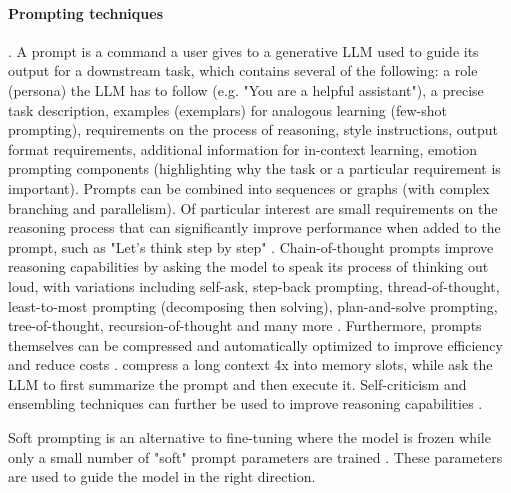 \documentclass[10pt]{article}
\begin{document}
\paragraph{Prompting techniques}. A prompt is a command a user gives to a generative LLM used to guide its output for a downstream task, which contains several of the following: a role (persona) the LLM has to follow (e.g. "You are a helpful assistant"), a precise task description, examples (exemplars) for analogous learning (few-shot prompting), requirements on the process of reasoning, style instructions, output format requirements, additional information for in-context learning, emotion prompting components (highlighting why the task or a particular requirement is important). Prompts can be combined into sequences or graphs (with complex branching and parallelism). Of particular interest are small requirements on the reasoning process that can significantly improve performance when added to the prompt, such as 
"Let’s think step by step" \cite{kojima2022large}. 
Chain-of-thought prompts improve reasoning capabilities by asking the model to speak its process of thinking out loud, with variations including self-ask, step-back prompting, thread-of-thought, least-to-most prompting (decomposing then solving), plan-and-solve prompting, tree-of-thought, recursion-of-thought and many more \cite{schulhoff2024prompt}. 
Furthermore, prompts themselves can be compressed and automatically optimized to improve efficiency and reduce costs \cite{chang2024efficient}. \cite{ge2023context} compress a long context 4x into memory slots, while \cite{weston2023system} ask the LLM to first summarize the prompt and then execute it. Self-criticism and ensembling techniques can further be used to improve reasoning capabilities \cite{schulhoff2024prompt}. 

Soft prompting is an alternative to fine-tuning where the model is frozen while only a small number of "soft" prompt parameters are trained \cite{lester2021prompt}. These parameters are used to guide the model in the right direction.
\end{document}
